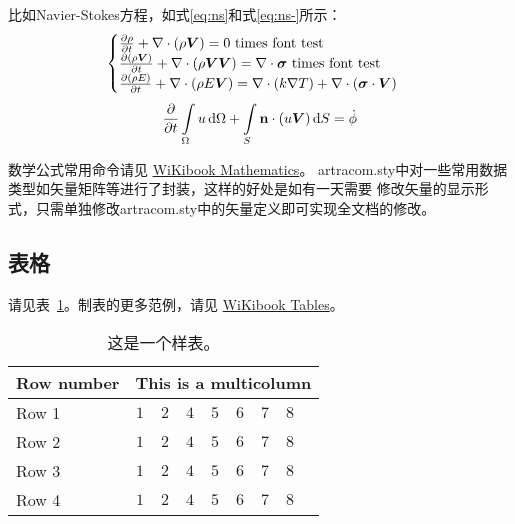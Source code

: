 比如Navier-Stokes方程，如式\eqref{eq:ns}和式\eqref{eq:ns-}所示：
\begin{equation}
    \label{eq:ns}
    \begin{cases}
        \frac{\partial \rho}{\partial t} + \nabla\cdot(\rho\Vector{V}) = 0 \ \mathrm{times\ font\ test}\\
        \frac{\partial (\rho\Vector{V})}{\partial t} + \nabla\cdot(\rho\Vector{V}\Vector{V}) = \nabla\cdot\Tensor{\sigma} \ \text{times font test}\\
        \frac{\partial (\rho E)}{\partial t} + \nabla\cdot(\rho E\Vector{V}) = \nabla\cdot(k\nabla T) + \nabla\cdot(\Tensor{\sigma}\cdot\Vector{V})
    \end{cases}
\end{equation}
\begin{equation}
    \label{eq:ns-}
    \frac{\partial }{\partial t}\int\limits_{\Omega} u \, \mathrm{d}\Omega + \int\limits_{S} \boldsymbol{\mathbf{n}}\cdot(u\boldsymbol{V}) \, \mathrm{d}S = \dot{\phi}
\end{equation}

数学公式常用命令请见
\href{https://en.wikibooks.org/wiki/LaTeX/Mathematics}{WiKibook Mathematics}。
artracom.sty中对一些常用数据类型如矢量矩阵等进行了封装，这样的好处是如有一天需要
修改矢量的显示形式，只需单独修改artracom.sty中的矢量定义即可实现全文档的修改。

\subsection{表格}\label{sub:tables}

请见表~\ref{tab:sample}。制表的更多范例，请见
\href{https://en.wikibooks.org/wiki/LaTeX/Tables}{WiKibook Tables}。
\begin{table}[!htbp]
    \caption[样表]{这是一个样表。}
    \label{tab:sample}
    \centering
    \footnotesize%
    \setlength{\tabcolsep}{4pt}%
    \renewcommand{\arraystretch}{1.2}%
    \begin{tabular}{lcccccccc}
        \hline
        Row number & \multicolumn{8}{c}{This is a multicolumn} \\
        \hline
        Row 1 & $1$ & $2$ & $4$ & $5$ & $6$ & $7$ & $8$\\
        Row 2 & $1$ & $2$ & $4$ & $5$ & $6$ & $7$ & $8$\\
        Row 3 & $1$ & $2$ & $4$ & $5$ & $6$ & $7$ & $8$\\
        Row 4 & $1$ & $2$ & $4$ & $5$ & $6$ & $7$ & $8$\\
        \hline
    \end{tabular}
\end{table}


